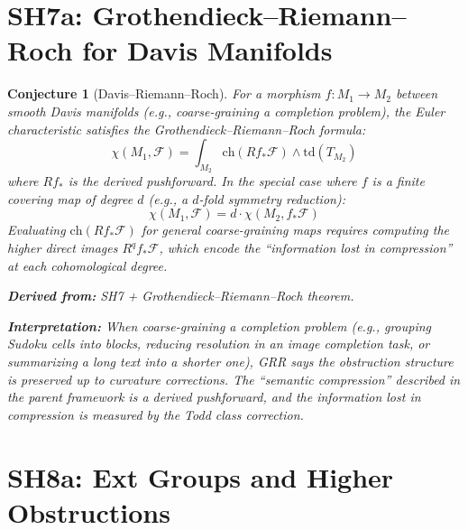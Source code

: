 \documentclass[11pt,letterpaper]{article}
\newtheorem{conjecture}{Conjecture}[section]
\newcommand{\sheaf}{\mathcal{F}}
\begin{document}
\section{SH7a: Grothendieck--Riemann--Roch for Davis Manifolds}

\begin{conjecture}[Davis--Riemann--Roch]\label{conj:grr}
For a morphism $f : M_1 \to M_2$ between smooth Davis manifolds (e.g., 
coarse-graining a completion problem), the Euler characteristic 
satisfies the Grothendieck--Riemann--Roch formula:
\begin{equation}\label{eq:grr}
    \chi(M_1, \sheaf) = \int_{M_2} \mathrm{ch}(Rf_* \sheaf) 
    \wedge \mathrm{td}(T_{M_2})
\end{equation}
where $Rf_*$ is the derived pushforward. In the special case where 
$f$ is a finite covering map of degree $d$ (e.g., a $d$-fold 
symmetry reduction):
\begin{equation}\label{eq:grr_finite}
    \chi(M_1, \sheaf) = d \cdot \chi(M_2, f_* \sheaf)
\end{equation}
Evaluating $\mathrm{ch}(Rf_* \sheaf)$ for general coarse-graining 
maps requires computing the higher direct images $R^q f_* \sheaf$, 
which encode the ``information lost in compression'' at each 
cohomological degree.

\textbf{Derived from:} SH7 + Grothendieck--Riemann--Roch theorem.

\textbf{Interpretation:} When coarse-graining a completion problem 
(e.g., grouping Sudoku cells into blocks, reducing resolution in an 
image completion task, or summarizing a long text into a shorter one), 
GRR says the obstruction structure is preserved up to curvature 
corrections. The ``semantic compression'' described in the parent 
framework is a derived pushforward, and the information lost in 
compression is measured by the Todd class correction.
\end{conjecture}

\section{SH8a: Ext Groups and Higher Obstructions}
\end{document}
